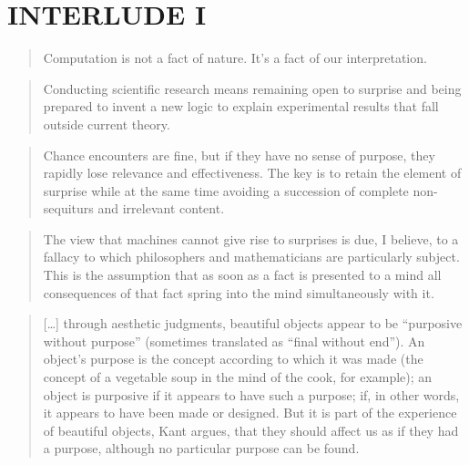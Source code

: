 
\pagestyle{empty}

\chapter*{INTERLUDE I}
\label{interlude1}


\begin{quotation}
  Computation is not a fact of nature. It's a fact of our interpretation.
\end{quotation}

\begin{quotation}
  Conducting scientific research means remaining open to surprise and being prepared to invent a new logic to explain experimental results that fall outside current theory. 
\end{quotation}

\begin{quotation}
  Chance encounters are fine, but if they have no sense of purpose, they rapidly lose relevance and effectiveness. The key is to retain the element of surprise while at the same time avoiding a succession of complete non-sequiturs and irrelevant content. 
\end{quotation}

\begin{quotation}
  The view that machines cannot give rise to surprises is due, I believe, to a fallacy to which philosophers and mathematicians are particularly subject. This is the assumption that as soon as a fact is presented to a mind all consequences of that fact spring into the mind simultaneously with it.
\end{quotation}

\begin{quotation}
  [\ldots] through aesthetic judgments, beautiful objects appear to be ``purposive without purpose'' (sometimes translated as ``final without end''). An object's purpose is the concept according to which it was made (the concept of a vegetable soup in the mind of the cook, for example); an object is purposive if it appears to have such a purpose; if, in other words, it appears to have been made or designed. But it is part of the experience of beautiful objects, Kant argues, that they should affect us as if they had a purpose, although no particular purpose can be found. 
\end{quotation}


\pagestyle{fania}


\clearpage
